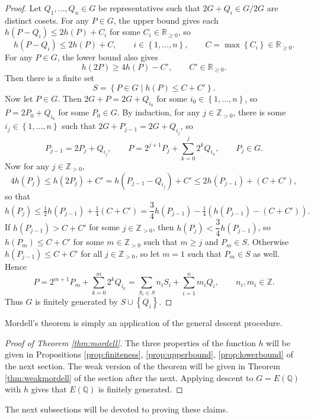 \documentclass{article}
\newcommand{\Z}{\mathbb{Z}}
\newcommand{\Q}{\mathbb{Q}}
\newcommand{\R}{\mathbb{R}}
\newcommand{\rb}[1]{\left( #1 \right)}
\newcommand{\cb}[1]{\left\{ #1 \right\}}
\theoremstyle{definition}
\begin{document}
\begin{proof}
Let $ Q_1, \dots, Q_n \in G $ be representatives such that $ 2G + Q_i \in G / 2G $ are distinct cosets. For any $ P \in G $, the upper bound gives each $ h\rb{P - Q_i} \le 2h\rb{P} + C_i $ for some $ C_i \in \R_{\ge 0} $, so
$$ h\rb{P - Q_i} \le 2h\rb{P} + C, \qquad i \in \cb{1, \dots, n}, \qquad C = \max\cb{C_i} \in \R_{\ge 0}. $$
For any $ P \in G $, the lower bound also gives
$$ h\rb{2P} \ge 4h\rb{P} - C', \qquad C' \in \R_{\ge 0}. $$
Then there is a finite set
$$ S = \cb{P \in G \mid h\rb{P} \le C + C'}. $$
Now let $ P \in G $. Then $ 2G + P = 2G + Q_{i_0} $ for some $ i_0 \in \cb{1, \dots, n} $, so $ P = 2P_0 + Q_{i_0} $ for some $ P_0 \in G $. By induction, for any $ j \in \Z_{> 0} $, there is some $ i_j \in \cb{1, \dots, n} $ such that $ 2G + P_{j - 1} = 2G + Q_{i_j} $, so
$$ P_{j - 1} = 2P_j + Q_{i_j}, \qquad P = 2^{j + 1}P_j + \sum_{k = 0}^j 2^kQ_{i_k}, \qquad P_j \in G. $$
Now for any $ j \in \Z_{> 0} $,
$$ 4h\rb{P_j} \le h\rb{2P_j} + C' = h\rb{P_{j - 1} - Q_{i_j}} + C' \le 2h\rb{P_{j - 1}} + \rb{C + C'}, $$
so that
$$ h\rb{P_j} \le \tfrac{1}{2}h\rb{P_{j - 1}} + \tfrac{1}{4}\rb{C + C'} = \dfrac{3}{4}h\rb{P_{j - 1}} - \tfrac{1}{4}\rb{h\rb{P_{j - 1}} - \rb{C + C'}}. $$
If $ h\rb{P_{j - 1}} > C + C' $ for some $ j \in \Z_{> 0} $, then $ h\rb{P_j} < \dfrac{3}{4}h\rb{P_{j - 1}} $, so $ h\rb{P_m} \le C + C' $ for some $ m \in \Z_{> 0} $ such that $ m \ge j $ and $ P_m \in S $. Otherwise $ h\rb{P_{j - 1}} \le C + C' $ for all $ j \in \Z_{> 0} $, so let $ m = 1 $ such that $ P_m \in S $ as well. Hence
$$ P = 2^{m + 1}P_m + \sum_{k = 0}^m 2^kQ_{i_k} = \sum_{S_i \in S} n_iS_i + \sum_{i = 1}^n m_iQ_i, \qquad n_i, m_i \in \Z. $$
Thus $ G $ is finitely generated by $ S \cup \cb{Q_i} $.
\end{proof}

Mordell's theorem is simply an application of the general descent procedure.

\begin{proof}[Proof of Theorem \ref{thm:mordell}]
The three properties of the function $ h $ will be given in Propositions \ref{prop:finiteness}, \ref{prop:upperbound}, \ref{prop:lowerbound} of the next section. The weak version of the theorem will be given in Theorem \ref{thm:weakmordell} of the section after the next. Applying descent to $ G = E\rb{\Q} $ with $ h $ gives that $ E\rb{\Q} $ is finitely generated.
\end{proof}

The next subsections will be devoted to proving these claims.
\end{document}
